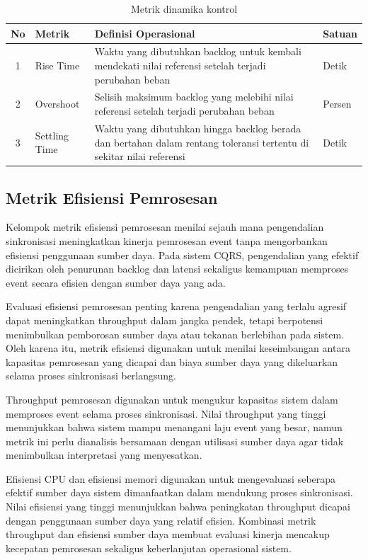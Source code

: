 \begin{table}[H]
    \centering
    \caption{Metrik dinamika kontrol}
    \label{tab:metrik-dinamika}
    \renewcommand{\arraystretch}{1.4}
    \begin{tabular}{|c|p{3cm}|p{6cm}|p{2.5cm}|}
    \hline
    \textbf{No} & \textbf{Metrik} & \textbf{Definisi Operasional} & \textbf{Satuan} \\
    \hline
    1 & Rise Time & Waktu yang dibutuhkan backlog untuk kembali mendekati nilai referensi setelah terjadi perubahan beban & Detik \\
    \hline
    2 & Overshoot & Selisih maksimum backlog yang melebihi nilai referensi setelah terjadi perubahan beban & Persen \\
    \hline
    3 & Settling Time & Waktu yang dibutuhkan hingga backlog berada dan bertahan dalam rentang toleransi tertentu di sekitar nilai referensi & Detik \\
    \hline
    \end{tabular}
\end{table}

\subsection{Metrik Efisiensi Pemrosesan}

Kelompok metrik efisiensi pemrosesan menilai sejauh mana pengendalian sinkronisasi meningkatkan kinerja pemrosesan event tanpa mengorbankan efisiensi penggunaan sumber daya.
Pada sistem CQRS, pengendalian yang efektif dicirikan oleh penurunan backlog dan latensi sekaligus kemampuan memproses event secara efisien dengan sumber daya yang ada.

Evaluasi efisiensi pemrosesan penting karena pengendalian yang terlalu agresif dapat meningkatkan throughput dalam jangka pendek, tetapi berpotensi menimbulkan pemborosan sumber daya atau tekanan berlebihan pada sistem.
Oleh karena itu, metrik efisiensi digunakan untuk menilai keseimbangan antara kapasitas pemrosesan yang dicapai dan biaya sumber daya yang dikeluarkan selama proses sinkronisasi berlangsung.

Throughput pemrosesan digunakan untuk mengukur kapasitas sistem dalam memproses event selama proses sinkronisasi.
Nilai throughput yang tinggi menunjukkan bahwa sistem mampu menangani laju event yang besar, namun metrik ini perlu dianalisis bersamaan dengan utilisasi sumber daya agar tidak menimbulkan interpretasi yang menyesatkan.

Efisiensi CPU dan efisiensi memori digunakan untuk mengevaluasi seberapa efektif sumber daya sistem dimanfaatkan dalam mendukung proses sinkronisasi.
Nilai efisiensi yang tinggi menunjukkan bahwa peningkatan throughput dicapai dengan penggunaan sumber daya yang relatif efisien.
Kombinasi metrik throughput dan efisiensi sumber daya membuat evaluasi kinerja mencakup kecepatan pemrosesan sekaligus keberlanjutan operasional sistem.

